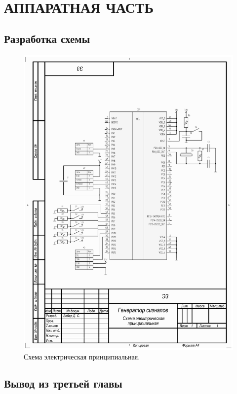 \chapter{АППАРАТНАЯ ЧАСТЬ}
\section{Разработка схемы}
\begin{figure}[H]
    \centering
    \includegraphics[width=1\textwidth]{../image/scheme-cropped.pdf}
    \caption{Схема электрическая принципиальная.}
\end{figure}

\section{Вывод из третьей главы}